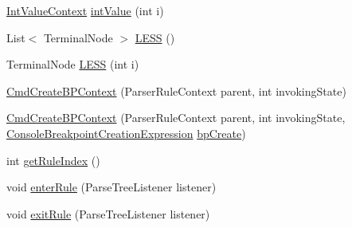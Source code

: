 \begin{DoxyCompactItemize}
\item 
\hyperlink{classgov_1_1nasa_1_1jpf_1_1inspector_1_1client_1_1parser_1_1_console_grammar_parser_1_1_int_value_context}{Int\+Value\+Context} \hyperlink{classgov_1_1nasa_1_1jpf_1_1inspector_1_1client_1_1parser_1_1_console_grammar_parser_1_1_cmd_create_b_p_context_ae38d050e12d6ff764300cf2ac7301e82}{int\+Value} (int i)
\item 
List$<$ Terminal\+Node $>$ \hyperlink{classgov_1_1nasa_1_1jpf_1_1inspector_1_1client_1_1parser_1_1_console_grammar_parser_1_1_cmd_create_b_p_context_acc7af355b3df13fbe4cb3d9cc1ee5e6e}{L\+E\+SS} ()
\item 
Terminal\+Node \hyperlink{classgov_1_1nasa_1_1jpf_1_1inspector_1_1client_1_1parser_1_1_console_grammar_parser_1_1_cmd_create_b_p_context_aefef15b685643c419061b2f6134346a6}{L\+E\+SS} (int i)
\item 
\hyperlink{classgov_1_1nasa_1_1jpf_1_1inspector_1_1client_1_1parser_1_1_console_grammar_parser_1_1_cmd_create_b_p_context_ac644cd57c2c5393a8efcd5b8ce3879a5}{Cmd\+Create\+B\+P\+Context} (Parser\+Rule\+Context parent, int invoking\+State)
\item 
\hyperlink{classgov_1_1nasa_1_1jpf_1_1inspector_1_1client_1_1parser_1_1_console_grammar_parser_1_1_cmd_create_b_p_context_ae80fa0008f77a2852d144d3174b6ae75}{Cmd\+Create\+B\+P\+Context} (Parser\+Rule\+Context parent, int invoking\+State, \hyperlink{classgov_1_1nasa_1_1jpf_1_1inspector_1_1client_1_1commands_1_1_cmd_breakpoint_create_1_1_console_breakpoint_creation_expression}{Console\+Breakpoint\+Creation\+Expression} \hyperlink{classgov_1_1nasa_1_1jpf_1_1inspector_1_1client_1_1parser_1_1_console_grammar_parser_1_1_cmd_create_b_p_context_aa46b8ffd99f0d421e0452e36af169dba}{bp\+Create})
\item 
int \hyperlink{classgov_1_1nasa_1_1jpf_1_1inspector_1_1client_1_1parser_1_1_console_grammar_parser_1_1_cmd_create_b_p_context_ade081f7a1406e197700b949c4700881e}{get\+Rule\+Index} ()
\item 
void \hyperlink{classgov_1_1nasa_1_1jpf_1_1inspector_1_1client_1_1parser_1_1_console_grammar_parser_1_1_cmd_create_b_p_context_a3205b6b9df5a31ca2a25f44cc0e53b3d}{enter\+Rule} (Parse\+Tree\+Listener listener)
\item 
void \hyperlink{classgov_1_1nasa_1_1jpf_1_1inspector_1_1client_1_1parser_1_1_console_grammar_parser_1_1_cmd_create_b_p_context_a39e7dd0ff72707d8d7c8329f5eda7734}{exit\+Rule} (Parse\+Tree\+Listener listener)
\end{DoxyCompactItemize}
